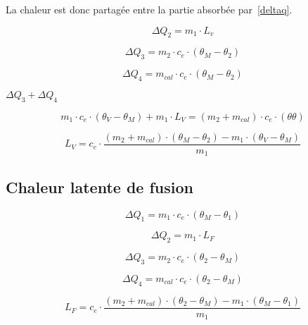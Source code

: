 La chaleur est donc partagée entre la partie absorbée par~\eqref{deltaq}.

\begin{equation}
    \Delta Q_2 = m_1 \cdot L_v
\end{equation}


\begin{equation}
    \Delta Q_3 = m_2 \cdot c_e \cdot (\theta_M - \theta_2)
\end{equation}

\begin{equation}
    \Delta Q_4 = m_{cal} \cdot c_e \cdot (\theta_M - \theta_2)
\end{equation}

$\Delta Q_3 + \Delta Q_4$

\begin{equation}
    m_1 \cdot c_e \cdot (\theta_V - \theta_M) + m_1 \cdot L_V = (m_2 + m_{cal}) \cdot c_e \cdot (\theta \theta)
\end{equation}

\begin{equation}
    \label{final_lv}
    L_V = c_e \cdot \frac{(m_2 + m_{cal})\cdot (\theta_M - \theta_2) - m_1 \cdot (\theta_V - \theta_M)}{m_1}
\end{equation}

\subsection{Chaleur latente de fusion}
\begin{equation}
    \Delta Q_1 = m_1 \cdot c_e \cdot (\theta_M - \theta_1)
\end{equation}

\begin{equation}
    \Delta Q_2=m_1 \cdot L_F
\end{equation}

\begin{equation}
    \Delta Q_3 = m_2 \cdot c_e \cdot (\theta_2 - \theta_M)
\end{equation}

\begin{equation}
    \Delta Q_4 = m_{cal} \cdot c_e \cdot (\theta_2 - \theta_M)
\end{equation}

\begin{equation}
    \label{final_lf}
    L_F = c_e \cdot \frac{(m_2 + m_{cal}) \cdot (\theta_2 -\theta_M)-m_1 \cdot (\theta_M - \theta_1)}{m_1}
\end{equation}

